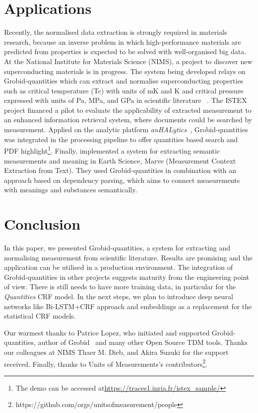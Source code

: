 \documentclass[sigconf]{acmart}
\begin{document}
\section{Applications}
\label{sec:use_cases}
Recently, the normalised data extraction is strongly required in materials research, because an inverse problem in which high-performance materials are predicted from properties is expected to be solved with well-organised big data. At the National Institute for Materials Science (NIMS), a project to discover new superconducting materials is in progress. The system being developed relays on Grobid-quantities which can extract and normalise superconducting properties such as critical temperature (Tc) with units of mK and K and critical pressure expressed with units of Pa, MPa, and GPa in scientific literature ~\cite{foppiano2019proposal}. The ISTEX~\cite{dazy2014istex} project financed a pilot to evaluate the applicability of extracted measurement to an enhanced information retrieval system, where documents could be searched by measurement. Applied on the analytic platform \textit{anHALytics}~\cite{anHALytics}, Grobid-quantities was integrated in the processing pipeline to offer quantities based search and PDF highlight\footnote{The demo can be accessed at\url{https://traces1.inria.fr/istex_sample/}}. Finally, \cite{hundman2017measurement} implemented a system for extracting semantic measurements and meaning in Earth Science, Marve (Measurement Context Extraction from Text). They used Grobid-quantities in combination with an approach based on dependency parsing, which aims to connect measurements with meanings and substances semantically.  

\section{Conclusion}
\label{sec:conclusion}
In this paper, we presented Grobid-quantities, a system for extracting and normalising measurement from scientific literature. Results are promising and the application can be utilised in a production environment. The integration of Grobid-quantities in other projects suggests maturity from the engineering point of view. There is still needs to have more training data, in particular for the \textit{Quantities} CRF model. In the next steps, we plan to introduce deep neural networks like Bi-LSTM+CRF approach and embeddings as a replacement for the statistical CRF models. 

\begin{acks}
Our warmest thanks to Patrice Lopez, who initiated and supported Grobid-quantities, author of Grobid~\cite{GROBID} and many other Open Source TDM tools. Thanks our colleagues at NIMS Thaer M. Dieb, and Akira Suzuki for the support received. Finally, thanks to Units of Measurements's contributors\footnote{https://github.com/orgs/unitsofmeasurement/people}.
\end{acks}




\end{document}
